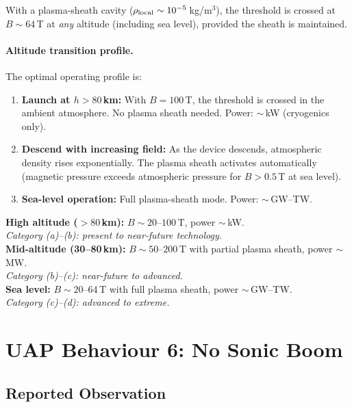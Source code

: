 \documentclass[12pt,a4paper]{article}
\begin{document}
With a plasma-sheath cavity ($\rho_{\rm local} \sim 10^{-5}$\,kg/m$^3$),
the threshold is crossed at $B \sim 64$\,T at \emph{any} altitude
(including sea level), provided the sheath is maintained.

\paragraph{Altitude transition profile.}
The optimal operating profile is:
\begin{enumerate}
\item \textbf{Launch at $h > 80$\,km:}  With $B = 100$\,T, the threshold
  is crossed in the ambient atmosphere.  No plasma sheath needed.
  Power: $\sim$\,kW (cryogenics only).
\item \textbf{Descend with increasing field:}  As the device descends,
  atmospheric density rises exponentially.  The plasma sheath activates
  automatically (magnetic pressure exceeds atmospheric pressure for
  $B > 0.5$\,T at sea level).
\item \textbf{Sea-level operation:}  Full plasma-sheath mode.
  Power: $\sim$\,GW--TW.
\end{enumerate}

\begin{tcolorbox}[colback=green!5!white, colframe=green!60!black,
  title=All-Altitude Assessment]
\textbf{High altitude ($> 80$\,km):} $B \sim 20$--$100$\,T, power $\sim$\,kW.\\
\emph{Category (a)--(b): present to near-future technology.}\\[4pt]
\textbf{Mid-altitude (30--80\,km):} $B \sim 50$--$200$\,T with partial
plasma sheath, power $\sim$\,MW.\\
\emph{Category (b)--(c): near-future to advanced.}\\[4pt]
\textbf{Sea level:} $B \sim 20$--$64$\,T with full plasma sheath,
power $\sim$\,GW--TW.\\
\emph{Category (c)--(d): advanced to extreme.}
\end{tcolorbox}


\section{UAP Behaviour 6: No Sonic Boom}\label{sec:boom}

\subsection{Reported Observation}
\end{document}
